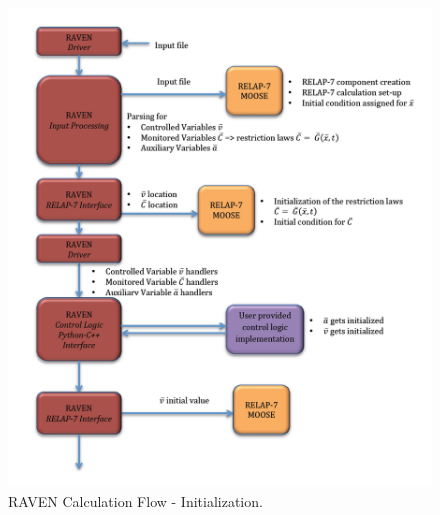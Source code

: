 \documentclass{mc2013}
\begin{document}
\label{sec:swLayoutCalcFlow}
\begin{figure}
  \centering
     \includegraphics[width=1\textwidth]{figures/CalculationFlow_part_1.PNG}
  \caption{RAVEN Calculation Flow - Initialization.}
  \label{fig:CalcFlow1}
\end{figure}
\end{document}
